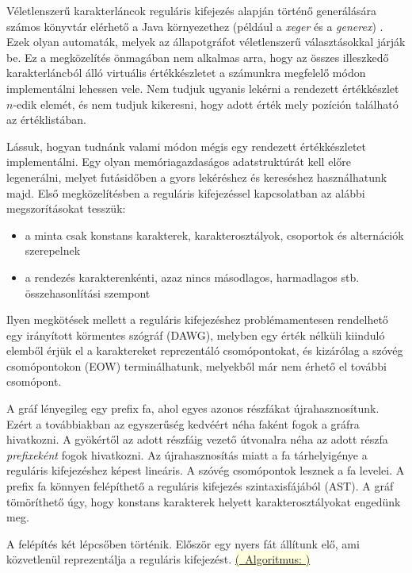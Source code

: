 \documentclass[
    parspace,
    noindent,
    nohyp,
]{elteiktdk}[2023/04/10]
\newcommand{\todoref}[1]{\todo[inline, noinlinepar, color=red, textcolor=white, inlinewidth=0.6cm, caption={#1}]{\large \textbf{×}}}
\newcommand{\algorithmref}[1]{\hyperref[algorithm:#1]{\colorbox{lightyellow}{%
(\textrightarrow~Algoritmus: \nameref*{algorithm:#1})}}}
\begin{document}
Véletlenszerű karakterláncok reguláris kifejezés alapján történő generálására
számos könyvtár elérhető a Java környezethez
(például a \textit{xeger} és a \textit{generex})
\todoref{+CITE: Xeger és Generex}.
Ezek olyan automaták, melyek az állapotgráfot véletlenszerű választásokkal járják be.
Ez a megközelítés önmagában nem alkalmas arra,
hogy az összes illeszkedő karakterláncból álló virtuális értékkészletet
a számunkra megfelelő módon implementálni lehessen vele.
Nem tudjuk ugyanis lekérni a rendezett értékkészlet $n$-edik elemét,
és nem tudjuk kikeresni, hogy adott érték mely pozíción található az értéklistában.

Lássuk, hogyan tudnánk valami módon mégis egy rendezett értékkészletet implementálni.
Egy olyan memóriagazdaságos adatstruktúrát kell előre legenerálni,
melyet futásidőben a gyors lekéréshez és kereséshez használhatunk majd.
Első megközelítésben a reguláris kifejezéssel kapcsolatban az alábbi megszorításokat tesszük:

\begin{itemize}
    \item a minta csak konstans karakterek, karakterosztályok, csoportok és alternációk szerepelnek
    \item a rendezés karakterenkénti, azaz nincs másodlagos, harmadlagos stb. összehasonlítási szempont
\end{itemize}

Ilyen megkötések mellett a reguláris kifejezéshez problémamentesen rendelhető egy
irányított körmentes szógráf (DAWG),
melyben egy érték nélküli kiinduló elemből érjük el a karaktereket reprezentáló csomópontokat,
és kizárólag a szóvég csomópontokon (EOW) terminálhatunk,
melyekből már nem érhető el további csomópont.\cite{AppelScrabble1988}

A gráf lényegileg egy prefix fa, ahol egyes azonos részfákat újrahasznosítunk.
Ezért a továbbiakban az egyszerűség kedvéért néha faként fogok a gráfra hivatkozni.
A gyökértől az adott részfáig vezető útvonalra
néha az adott részfa \textit{prefixeként} fogok hivatkozni.
Az újrahasznosítás miatt a fa tárhelyigénye a reguláris kifejezéshez képest lineáris.
A szóvég csomópontok lesznek a fa levelei.
A prefix fa könnyen felépíthető a reguláris kifejezés szintaxisfájából (AST).
A gráf tömöríthető úgy, hogy konstans karakterek helyett karakterosztályokat engedünk meg.

A felépítés két lépcsőben történik.
Először egy nyers fát állítunk elő, ami közvetlenül reprezentálja a reguláris kifejezést.
\algorithmref{regex_wordtree_create_raw}
\end{document}
